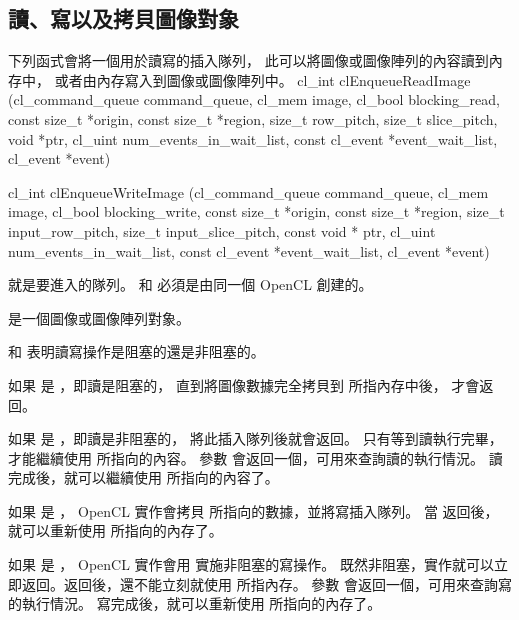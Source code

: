 \subsection{讀、寫以及拷貝圖像對象}

下列函式會將一個用於讀寫的插入隊列，
此可以將圖像或圖像陣列的內容讀到內存中，
或者由內存寫入到圖像或圖像陣列中。
\startCLFUNC
cl_int clEnqueueReadImage (cl_command_queue command_queue,
			cl_mem image,
			cl_bool blocking_read,
			const size_t *origin,
			const size_t *region,
			size_t row_pitch,
			size_t slice_pitch,
			void *ptr,
			cl_uint num_events_in_wait_list,
			const cl_event *event_wait_list,
			cl_event *event)

cl_int clEnqueueWriteImage (cl_command_queue command_queue,
			cl_mem image,
			cl_bool blocking_write,
			const size_t *origin,
			const size_t *region,
			size_t input_row_pitch,
			size_t input_slice_pitch,
			const void * ptr,
			cl_uint num_events_in_wait_list,
			const cl_event *event_wait_list,
			cl_event *event)
\stopCLFUNC

 就是要進入的隊列。
 和  必須是由同一個 OpenCL 創建的。

 是一個圖像或圖像陣列對象。

 和  表明讀寫操作是{\ftRef 阻塞}的還是{\ftRef 非阻塞}的。

如果  是 ，即讀是阻塞的，
直到將圖像數據完全拷貝到  所指內存中後，  才會返回。

如果  是 ，即讀是非阻塞的，  將此插入隊列後就會返回。
只有等到讀執行完畢，才能繼續使用  所指向的內容。
參數  會返回一個，可用來查詢讀的執行情況。
讀完成後，就可以繼續使用  所指向的內容了。

如果  是 ， OpenCL 實作會拷貝  所指向的數據，並將寫插入隊列。
當  返回後，就可以重新使用  所指向的內存了。

如果  是 ， OpenCL 實作會用  實施非阻塞的寫操作。
既然非阻塞，實作就可以立即返回。返回後，還不能立刻就使用  所指內存。
參數  會返回一個，可用來查詢寫的執行情況。
寫完成後，就可以重新使用  所指向的內存了。

